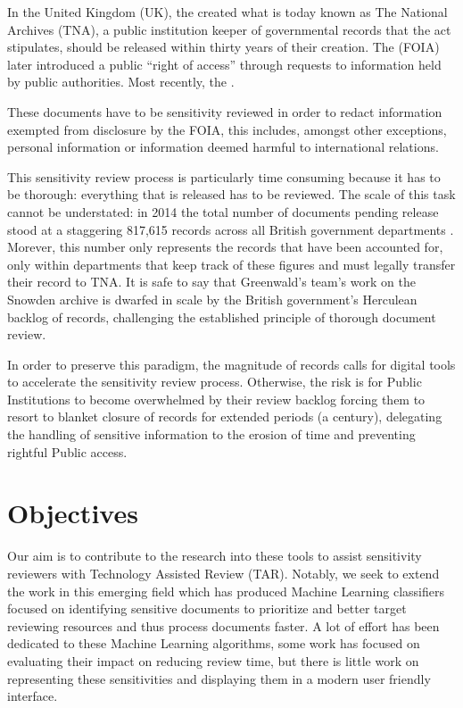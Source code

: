 \documentclass{l4proj}
\begin{document}
In the United Kingdom (UK), the \textcite{PublicRecordsAct1958} created what is today known as The National Archives (TNA), a public institution keeper of governmental records that the act stipulates, should be released within thirty years of their creation.
The \textcite{FreedomInformationAct2000} (FOIA) later introduced a public ``right of access'' through requests to information held by public authorities.
Most recently, the \textcite{ConstitutionalReformGovernance2010}.

These documents have to be sensitivity reviewed in order to redact information exempted from disclosure by the FOIA, this includes, amongst other exceptions, personal information or information deemed harmful to international relations.

This sensitivity review process is particularly time consuming because it has to be thorough: everything that is released has to be reviewed.
The scale of this task cannot be understated: in 2014 the total number of documents pending release stood at a staggering 817,615 records across all British government departments \autocite{allanRecordsReview2014,thenationalarchivesRecordTransferReport2014}.
Morever, this number only represents the records that have been accounted for, only within departments that keep track of these figures and must legally transfer their record to TNA.
It is safe to say that Greenwald's team's work on the Snowden archive is dwarfed in scale by the British government's Herculean backlog of records, challenging the established principle of thorough document review.

In order to preserve this paradigm, the magnitude of records calls for digital tools to accelerate the sensitivity review process.
Otherwise, the risk is for Public Institutions to become overwhelmed by their review backlog forcing them to resort to blanket closure of records for extended periods (a century), delegating the handling of sensitive information to the erosion of time and preventing rightful Public access.

\section{Objectives}

Our aim is to contribute to the research into these tools to assist sensitivity reviewers with Technology Assisted Review (TAR).
Notably, we seek to extend the work in this emerging field which has produced Machine Learning classifiers focused on identifying sensitive documents to prioritize and better target reviewing resources and thus process documents faster.
A lot of effort has been dedicated to these Machine Learning algorithms, some work has focused on evaluating their impact on reducing review time, but there is little work on representing these sensitivities and displaying them in a modern user friendly interface.
\end{document}
